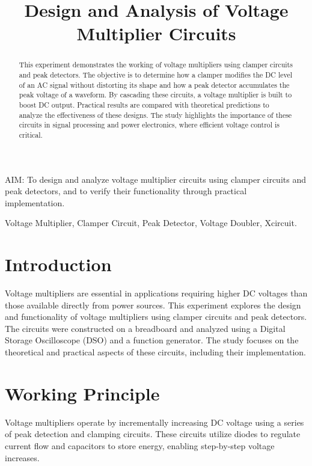 \documentclass[9pt,conference]{IEEEtran}
\begin{document}
\title{Design and Analysis of Voltage Multiplier Circuits}
\author{
}
\maketitle

\begin{aim}
AIM: To design and analyze voltage multiplier circuits using clamper circuits and peak detectors, and to verify their functionality through practical implementation.
\end{aim}

\begin{abstract}
This experiment demonstrates the working of voltage multipliers using clamper circuits and peak detectors. The objective is to determine how a clamper modifies the DC level of an AC signal without distorting its shape and how a peak detector accumulates the peak voltage of a waveform. By cascading these circuits, a voltage multiplier is built to boost DC output. Practical results are compared with theoretical predictions to analyze the effectiveness of these designs. The study highlights the importance of these circuits in signal processing and power electronics, where efficient voltage control is critical.
\end{abstract}

\begin{IEEEkeywords}
Voltage Multiplier, Clamper Circuit, Peak Detector, Voltage Doubler, Xcircuit.
\end{IEEEkeywords}

\section{Introduction}
Voltage multipliers are essential in applications requiring higher DC voltages than those available directly from power sources. This experiment explores the design and functionality of voltage multipliers using clamper circuits and peak detectors. The circuits were constructed on a breadboard and analyzed using a Digital Storage Oscilloscope (DSO) and a function generator. The study focuses on the theoretical and practical aspects of these circuits, including their implementation.

\section{Working Principle}
Voltage multipliers operate by incrementally increasing DC voltage using a series of peak detection and clamping circuits. These circuits utilize diodes to regulate current flow and capacitors to store energy, enabling step-by-step voltage increases.
\end{document}
